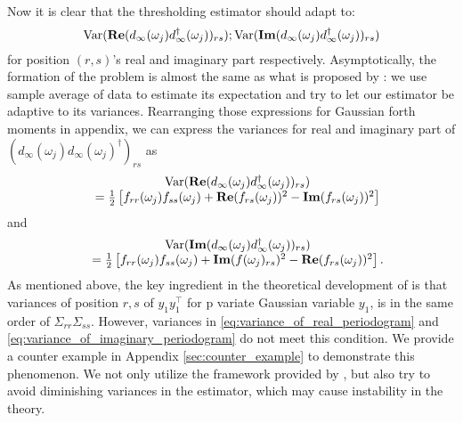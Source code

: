 Now it is clear that the thresholding estimator should adapt to: 
\[
\mathrm{Var}(\mathbf{Re}(d_{\infty}(\omega_j)d^\dag_{\infty}(\omega_j))_{rs}); 
\mathrm{Var}(\mathbf{Im}(d_{\infty}(\omega_j)d^\dag_{\infty}(\omega_j))_{rs})
\]
for position $(r,s)$'s real and imaginary part respectively. Asymptotically, the formation of the problem is almost the same as what is proposed by \cite{cai2011adaptive}: we use sample average of data to estimate its expectation and try to let our estimator be adaptive to its variances. Rearranging those expressions for Gaussian forth moments in appendix, we can express the variances for real and imaginary part of $(d_{\infty}(\omega_j)d_{\infty}(\omega_j)^\dag)_{rs}$ as 
\begin{equation}
\label{eq:variance_of_real_periodogram}
\begin{array}{cc}
&\mathrm{Var}(\mathbf{Re}(d_{\infty}(\omega_j)d^\dag_{\infty}(\omega_j))_{rs})      \\
& = \frac{1}{2}\left[f_{rr}(\omega_j)f_{ss}(\omega_j)+\mathbf{Re}(f_{rs}(\omega_j))^2-\mathbf{Im}(f_{rs}(\omega_j))^2\right]
\end{array}
\end{equation}
and 
\begin{equation}
\label{eq:variance_of_imaginary_periodogram}
\begin{array}{cc}
&\mathrm{Var}(\mathbf{Im}(d_{\infty}(\omega_j)d^\dag_{\infty}(\omega_j))_{rs})      \\
& = \frac{1}{2}\left[f_{rr}(\omega_j)f_{ss}(\omega_j)+\mathbf{Im}(f(\omega_j)_{rs})^2-\mathbf{Re}(f_{rs}(\omega_j))^2\right].
\end{array}
\end{equation}
As mentioned above, the key ingredient in the theoretical development of \cite{cai2011adaptive} is that variances of position $r, s$ of $y_1y_1^\top$ for p variate Gaussian variable $y_1$,  is in the same order of $\Sigma_{rr}\Sigma_{ss}$. However, variances in \eqref{eq:variance_of_real_periodogram} and \eqref{eq:variance_of_imaginary_periodogram}  do not meet this condition. We provide a counter example in Appendix \ref{sec:counter_example} to demonstrate this phenomenon.
We not only utilize the framework provided by \cite{cai2011adaptive}, but also try to avoid diminishing variances in the estimator, which may cause instability in the theory. \par 

